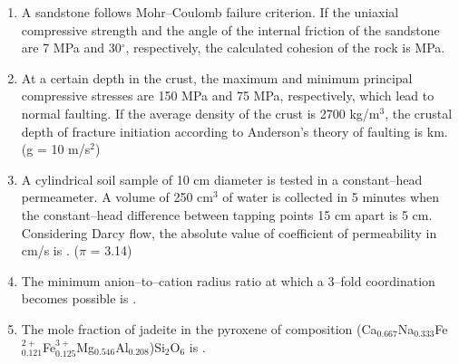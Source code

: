 \documentclass[journal,12pt,onecolumn]{IEEEtran}
\theoremstyle{remark}
\begin{document}
\begin{enumerate}
\item A sandstone follows Mohr--Coulomb failure criterion. If the uniaxial compressive strength and the angle of the internal friction of the sandstone are 7 MPa and 30$^\circ$, respectively, the calculated cohesion of the rock is \underline{\hspace{10mm}} MPa.  
\vspace{0.5cm}

\item At a certain depth in the crust, the maximum and minimum principal compressive stresses are 150 MPa and 75 MPa, respectively, which lead to normal faulting. If the average density of the crust is 2700 kg/m$^3$, the crustal depth of fracture initiation according to Anderson's theory of faulting is \underline{\hspace{10mm}} km. (g = 10 m/s$^2$)  
\vspace{0.5cm}

\item A cylindrical soil sample of 10 cm diameter is tested in a constant--head permeameter. A volume of 250 cm$^3$ of water is collected in 5 minutes when the constant--head difference between tapping points 15 cm apart is 5 cm. Considering Darcy flow, the absolute value of coefficient of permeability in cm/s is \underline{\hspace{10mm}}. ($\pi$ = 3.14)  
\vspace{0.5cm}

\item The minimum anion--to--cation radius ratio at which a 3--fold coordination becomes possible is \underline{\hspace{10mm}}.  
\vspace{0.5cm}

\item The mole fraction of jadeite in the pyroxene of composition {\small(Ca$_{0.667}$Na$_{0.333}$Fe$^{2+}_{0.121}$Fe$^{3+}_{0.125}$Mg$_{0.546}$Al$_{0.208}$)Si$_2$O$_6$} is \underline{\hspace{10mm}}.
\vspace{0.5cm}


\end{enumerate}
\end{document}
